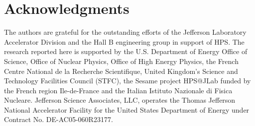 \documentclass[twocolumn, showpacs, preprintnumbers,prd, superscriptaddress]{revtex4-1}
\begin{document}
    \section{Acknowledgments}
 
        The authors are grateful for the outstanding efforts of the Jefferson 
        Laboratory Accelerator Division and the Hall B engineering group in 
        support of HPS. The research reported here is supported by the U.S.
        Department of Energy Office of Science, Office of Nuclear Physics, 
        Office of High Energy Physics, the French Centre National de la 
        Recherche Scientifique, 
        United Kingdom's Science and Technology Facilities Council (STFC),
        the Sesame project HPS@JLab funded by the French region Ile-de-France 
        and the Italian Istituto Nazionale di Fisica Nucleare. Jefferson Science
        Associates, LLC, operates the Thomas Jefferson National Accelerator
        Facility for the United States Department of Energy under Contract
        No. DE-AC05-060R23177. 
    
    
\end{document}
